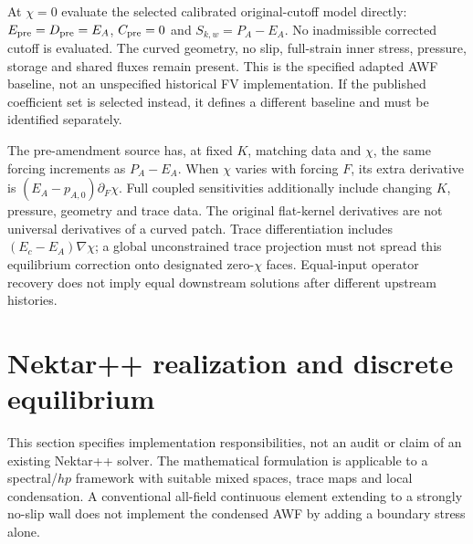 \documentclass[11pt,a4paper]{article}
\numberwithin{equation}{section}
\begin{document}
At $\chi=0$ evaluate the selected calibrated original-cutoff model
directly: $E_{\rm pre}=D_{\rm pre}=E_A$, $C_{\rm pre}=0$ and
$S_{k,w}=P_A-E_A$. No inadmissible corrected cutoff is evaluated.
The curved geometry, no slip, full-strain inner stress, pressure,
storage and shared fluxes remain present. This is the specified adapted
AWF baseline, not an unspecified historical FV implementation. If the
published coefficient set is selected instead, it defines a different
baseline and must be identified separately.

The pre-amendment source has, at fixed $K$, matching data and $\chi$,
the same forcing increments as $P_A-E_A$. When $\chi$ varies with
forcing $F$, its extra derivative is
$(E_A-p_{A,0})\partial_F\chi$. Full coupled sensitivities additionally
include changing $K$, pressure, geometry and trace data. The original
flat-kernel derivatives are not universal derivatives of a curved patch.
Trace differentiation includes $(E_c-E_A)\nabla\chi$; a global
unconstrained trace projection must not spread this equilibrium correction
onto designated zero-$\chi$ faces. Equal-input operator recovery does
not imply equal downstream solutions after different upstream histories.


\section{Nektar++ realization and discrete equilibrium}
\label{sec:nektar}
This section specifies implementation responsibilities, not an audit or
claim of an existing Nektar++ solver. The mathematical formulation is
applicable to a spectral/$hp$ framework with suitable mixed spaces,
trace maps and local condensation. A conventional all-field continuous
element extending to a strongly no-slip wall does not implement the
condensed AWF by adding a boundary stress alone.
\end{document}

